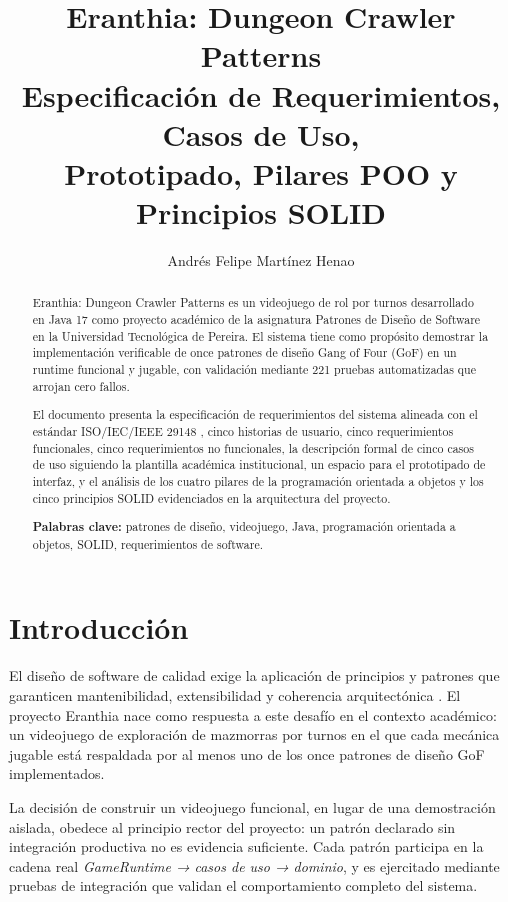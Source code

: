 \documentclass[stu,12pt,floatsintext]{apa7}
\title{Eranthia: Dungeon Crawler Patterns\\
Especificación de Requerimientos, Casos de Uso,\\
Prototipado, Pilares POO y Principios SOLID}
\author{Andrés Felipe Martínez Henao}
\affiliation{%
Universidad Tecnológica de Pereira\\
Facultad de Ingenierías\\
Tecnología en Desarrollo de Software
}
\begin{document}
\maketitle


\begin{abstract}
Eranthia: Dungeon Crawler Patterns es un videojuego de rol por turnos desarrollado en Java 17 como proyecto académico de la asignatura Patrones de Diseño de Software en la Universidad Tecnológica de Pereira. El sistema tiene como propósito demostrar la implementación verificable de once patrones de diseño Gang of Four (GoF) en un runtime funcional y jugable, con validación mediante 221 pruebas automatizadas que arrojan cero fallos.

El documento presenta la especificación de requerimientos del sistema alineada con el estándar ISO/IEC/IEEE 29148 \parencite{iso29148}, cinco historias de usuario, cinco requerimientos funcionales, cinco requerimientos no funcionales, la descripción formal de cinco casos de uso siguiendo la plantilla académica institucional, un espacio para el prototipado de interfaz, y el análisis de los cuatro pilares de la programación orientada a objetos y los cinco principios SOLID evidenciados en la arquitectura del proyecto.

\textbf{Palabras clave:} patrones de diseño, videojuego, Java, programación orientada a objetos, SOLID, requerimientos de software.
\end{abstract}

\newpage


\section{Introducción}

El diseño de software de calidad exige la aplicación de principios y patrones que garanticen mantenibilidad, extensibilidad y coherencia arquitectónica \parencite{gamma1994,martin2003}. El proyecto Eranthia nace como respuesta a este desafío en el contexto académico: un videojuego de exploración de mazmorras por turnos en el que cada mecánica jugable está respaldada por al menos uno de los once patrones de diseño GoF implementados.

La decisión de construir un videojuego funcional, en lugar de una demostración aislada, obedece al principio rector del proyecto: un patrón declarado sin integración productiva no es evidencia suficiente. Cada patrón participa en la cadena real \textit{GameRuntime → casos de uso → dominio}, y es ejercitado mediante pruebas de integración que validan el comportamiento completo del sistema.
\end{document}
